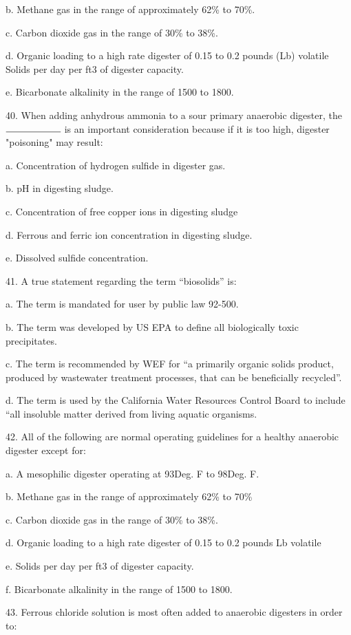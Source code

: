 \documentclass{article}
\begin{document}
b. Methane gas in the range of approximately 62\% to 70\%. 

c. Carbon dioxide gas in the range of 30\% to 38\%. 

d. Organic loading to a high rate digester of 0.15 to 0.2 pounds (Lb) volatile Solids per day per ft3 of digester capacity. 

e. Bicarbonate alkalinity in the range of 1500 to 1800. 


40. When adding anhydrous ammonia to a sour primary anaerobic digester, the $\rule{2cm}{0.15mm}$ is an important consideration because if it is too high, digester "poisoning" may result:

a. Concentration of hydrogen sulfide in digester gas. 

b. pH in digesting sludge. 

c. Concentration of free copper ions in digesting sludge 

d. Ferrous and ferric ion concentration in digesting sludge. 

e. Dissolved sulfide concentration. 


41. A true statement regarding the term “biosolids” is:

a. The term is mandated for user by public law 92-500. 

b. The term was developed by US EPA to define all biologically toxic precipitates. 

c. The term is recommended by WEF for “a primarily organic solids product, produced by wastewater treatment processes, that can be beneficially recycled”. 

d. The term is used by the California Water Resources Control Board to include “all insoluble matter derived from living aquatic organisms. 


42. All of the following are normal operating guidelines for a healthy anaerobic digester except for:

a. A mesophilic digester operating at 93Deg. F to 98Deg. F. 

b. Methane gas in the range of approximately 62\% to 70\% 

c. Carbon dioxide gas in the range of 30\% to 38\%. 

d. Organic loading to a high rate digester of 0.15 to 0.2 pounds Lb volatile 

e. Solids per day per ft3 of digester capacity. 

f. Bicarbonate alkalinity in the range of 1500 to 1800. 


43. Ferrous chloride solution is most often added to anaerobic digesters in order to:
\end{document}
